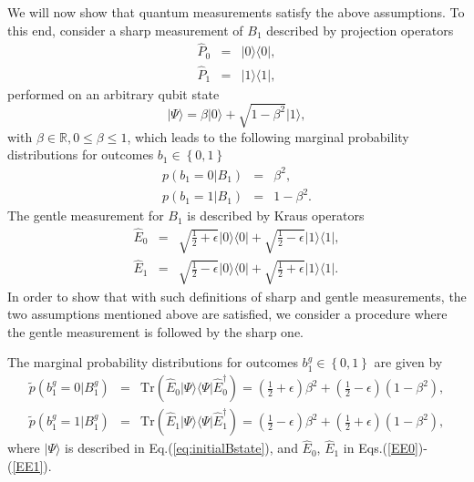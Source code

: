 \documentclass[pra,twocolumn,showpacs,preprintnumbers,amsmath,amssymb,superscriptaddress]{revtex4-1}
\def\be{\begin{equation}}
\def\ee{\end{equation}}
\def\ben{\begin{eqnarray}}
\def\een{\end{eqnarray}}
\def\>{\rangle}
\def\omeas{B_1}
\def\ogentle{B_1^g}
\newcommand{\ket}[1]{| #1 \rangle}
\newcommand{\proj}[1]{| #1 \rangle   \langle #1 |}
\def\tr{\textrm{Tr}}
\begin{document}
\begin{appendix}
We will now show that quantum measurements satisfy the above assumptions.
To this end, consider a sharp measurement of $\omeas$ described by projection operators
\ben
\label{eq:POVM1}
\hat{P}_0&=& \proj{0}, \\
\label{eq:POVM2}
\hat{P}_1&=& \proj{1},
\een
performed on an arbitrary qubit state
\be
|\Psi\>=\beta |0\> + \sqrt{1-\beta^2}|1\>,
\label{eq:initialBstate}
\ee
with $\beta \in \mathbb{R}, 0 \leq \beta \leq 1$, which leads to the following marginal probability distributions for outcomes $b_1 \in \left\{0,1\right\}$
\ben
\label{original1}
p(b_1=0|\omeas)&=&\beta^2,\\
\label{original2}
p(b_1=1|\omeas)&=&1-\beta^2.
\een
The gentle measurement for $\omeas$ is described by Kraus operators
\ben
\label{EE0}
\hat{E}_0&=&\sqrt{\tfrac12+\epsilon}\proj{0}+\sqrt{\tfrac12-\epsilon}\proj{1}, \\
\label{EE1}
\hat{E}_1&=&\sqrt{\tfrac12-\epsilon}\proj{0}+\sqrt{\tfrac12+\epsilon}\proj{1}.
\een
In order to show that with such definitions of sharp and gentle measurements, the two assumptions mentioned above are satisfied, we consider a procedure where the gentle measurement is followed by the sharp one. 


The marginal probability distributions for outcomes $b_1^{g} \in \left\{0,1\right\}$ are given by
\ben
\label{eq:aver1a}
\tilde p(b_1^{g}=0|\ogentle)&=&\tr (\hat{E}_0 \proj{\Psi} \hat{E}^\dagger_0)=\left(\frac12 +\epsilon\right) \beta^2 + \left(\frac12 -\epsilon\right)\left(1-\beta^2\right), \\
\label{eq:aver1b}
\tilde p(b_1^{g}=1|\ogentle)&=&\tr (\hat{E}_1 \proj{\Psi} \hat{E}^\dagger_1)=\left(\frac12 -\epsilon\right) \beta^2 + \left(\frac12 +\epsilon\right)\left(1-\beta^2\right),
\een
where $\ket{\Psi}$ is described in Eq.(\ref{eq:initialBstate}), and $\hat{E}_0$, $\hat{E}_1$ in Eqs.(\ref{EE0})-(\ref{EE1}).


\end{appendix}
\end{document}

